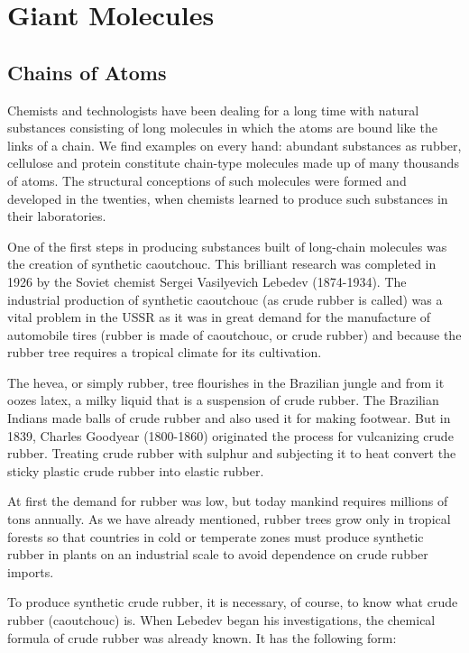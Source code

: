 

\cleardoublepage
\chapter{Giant Molecules}
\label{ch-09}

\section{Chains of Atoms}

Chemists and technologists have been dealing for a long time with natural substances consisting of long molecules in which the atoms are bound like the links of a chain. We find examples on every hand: abundant substances as rubber, cellulose and protein constitute chain-type molecules made up of many thousands of atoms. The structural conceptions of such molecules were formed and developed in the twenties, when chemists learned to produce such substances in their laborato­ries.

One of the first steps in producing substances built of long-chain molecules was the creation of synthetic caout­chouc. This brilliant research was completed in 1926 by the Soviet chemist Sergei Vasilyevich Lebedev (1874-1934). The industrial production of synthetic caoutchouc (as crude rubber is called) was a vital problem in the USSR as it was in great demand for the manufacture of automobile tires (rubber is made of caoutchouc, or crude rubber) and because the rubber tree requires a tropical climate for its cultivation.

The hevea, or simply rubber, tree flourishes in the Brazilian jungle and from it oozes latex, a milky liquid that is a suspension of crude rubber. The Brazilian Indians made balls of crude rubber and also used it for making footwear. But in 1839, Charles Goodyear (1800-1860) originated the process for vulcanizing crude rubber. Treating crude rubber with sulphur and subjecting it to heat convert the sticky plastic crude rubber into elastic rubber.

At first the demand for rubber was low, but today mankind requires millions of tons annually. As we have already mentioned, rubber trees grow only in tropical forests so that countries in cold or temperate zones must produce synthetic rubber in plants on an industrial scale to avoid dependence on crude rubber imports.

To produce synthetic crude rubber, it is necessary, of course, to know what crude rubber (caoutchouc) is. When Lebedev began his investigations, the chemical formula of crude rubber was already known. It has the following form:

